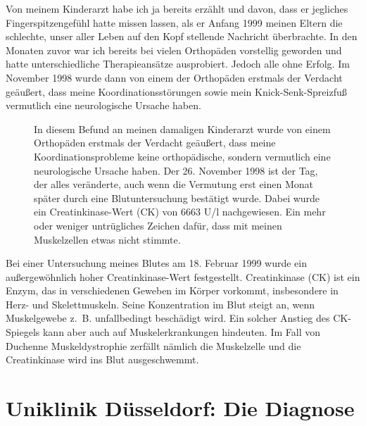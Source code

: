 \documentclass[fontsize=14pt,a4paper,headinclude,DIV=calc,automark]{scrbook}
\begin{document}
Von meinem Kinderarzt habe ich ja bereits erzählt und davon, dass er jegliches Fingerspitzengefühl hatte missen lassen, als er Anfang 1999 meinen Eltern die schlechte, unser aller Leben auf den Kopf stellende Nachricht überbrachte. In den Monaten zuvor war ich bereits bei vielen Orthopäden vorstellig geworden und hatte unterschiedliche Therapieansätze ausprobiert. Jedoch alle ohne Erfolg. Im November 1998 wurde dann von einem der Orthopäden erstmals der Verdacht geäußert, dass meine Koordinationsstörungen sowie mein Knick-Senk-Spreizfuß vermutlich eine neurologische Ursache haben.

\setlength{\fboxsep}{0pt}    %
\setlength{\fboxrule}{0.2pt} %
\begin{figure}[H]
    \centering
    \caption{In diesem Befund an meinen damaligen Kinderarzt wurde von einem Orthopäden erstmals der Verdacht geäußert, dass meine Koordinationsprobleme keine orthopädische, sondern vermutlich eine neurologische Ursache haben. Der 26. November 1998 ist der Tag, der alles veränderte, auch wenn die Vermutung erst einen Monat später durch eine Blutuntersuchung bestätigt wurde. Dabei wurde ein Creatinkinase-Wert (CK) von 6663 U/l nachgewiesen. Ein mehr oder weniger untrügliches Zeichen dafür, dass mit meinen Muskelzellen etwas nicht stimmte.}
    \label{fig:befund}
\end{figure}

Bei einer Untersuchung meines Blutes am 18. Februar 1999 wurde ein außergewöhnlich hoher Creatinkinase-Wert festgestellt. Creatinkinase (CK) ist ein Enzym, das in verschiedenen Geweben im Körper vorkommt, insbesondere in Herz- und Skelettmuskeln. Seine Konzentration im Blut steigt an, wenn Muskelgewebe z.~B. unfallbedingt beschädigt wird. Ein solcher Anstieg des CK-Spiegels kann aber auch auf Muskelerkrankungen hindeuten. Im Fall von Duchenne Muskeldystrophie zerfällt nämlich die Muskelzelle und die Creatinkinase wird ins Blut ausgeschwemmt.

\section{Uniklinik Düsseldorf: Die Diagnose}
\label{sec:kontrolluntersuchungen}
\end{document}
